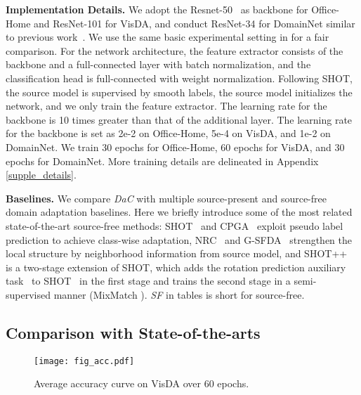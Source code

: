 \documentclass{article}
\newcommand{\modelName}{DaC}
\begin{document}
\textbf{Implementation Details.} We adopt the Resnet-50~\cite{He2016Resnet} as backbone for Office-Home and ResNet-101 for VisDA, and conduct ResNet-34 for DomainNet similar to previous work~\cite{saito2019semidomainnet,li2021semiuda}. We use the same basic experimental setting in \cite{shot,nrc_nips_2021} for a fair comparison. For the network architecture, the feature extractor consists of the backbone and a full-connected layer with batch normalization, and the classification head is full-connected with weight normalization. Following SHOT, the source model is supervised by smooth labels, the source model initializes the network, and we only train the feature extractor. 
The learning rate for the backbone is 10 times greater than that of the additional layer. The learning rate for the backbone is set as 2e-2 on Office-Home, 5e-4 on VisDA, and 1e-2 on DomainNet. We train 30 epochs for Office-Home, 60 epochs for VisDA, and 30 epochs for DomainNet.
More training details are delineated in Appendix \ref{supple_details}.


\textbf{Baselines.} We compare \textit{\modelName} with multiple source-present and source-free domain adaptation baselines. Here we briefly introduce some of the most related state-of-the-art source-free methods: SHOT~\cite{shot} and CPGA~\cite{Qiu2021ijcai} exploit pseudo label prediction to achieve class-wise adaptation, NRC~\cite{nrc_nips_2021} and G-SFDA~\cite{gsfda_iccv_2021} strengthen the local structure by neighborhood information from source model, and SHOT++~\cite{liang2021shot_pp} is a two-stage extension of SHOT, which adds the rotation prediction auxiliary task~\cite{rotation2018} to SHOT~\cite{shot} in the first stage and trains the second stage in a semi-supervised manner (MixMatch \cite{berthelot2019mixmatch}).
\textit{SF} in tables is short for source-free.

\subsection{Comparison with State-of-the-arts}


\begin{wrapfigure}{!htbp}{0.4\textwidth}
  \begin{center}
    \texttt{[image: fig\_acc.pdf]}
  \end{center}
\caption{Average accuracy curve on VisDA over 60 epochs.}
  \label{fig:curve}
\end{wrapfigure}
\end{document}
